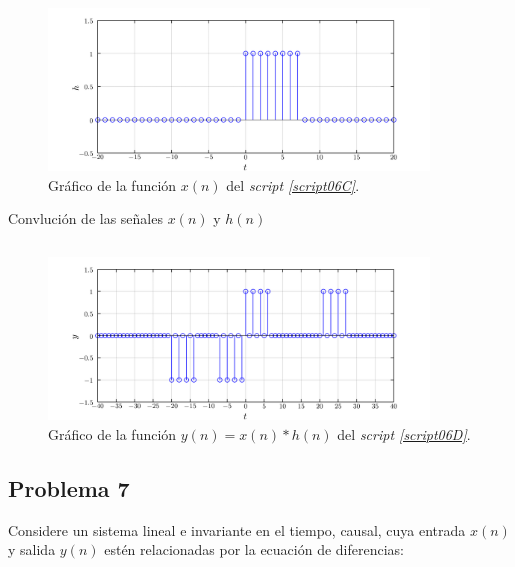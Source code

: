 \documentclass[a4paper,12pt,final]{article}
\begin{document}
    \begin{figure}[H]
      \begin{center}
        \caption{Gráfico de la función $x\left(n\right)$ del \emph{script \ref{script06C}}.}
        \includegraphics[width=0.90\textwidth]{./laboratorio_3/problema06_H.png}
      \end{center}
    \end{figure}

    \begin{listing}[H]
      \caption{Convlución de las señales $x\left(n\right)$ y $h\left(n\right)$ }
      \label{script06D}
      \inputminted{matlab}{./laboratorio_3/problema06.m}
    \end{listing}

    \begin{figure}[H]
      \begin{center}
        \caption{Gráfico de la función $y\left(n\right) = x\left(n\right) * h\left(n\right)$ del \emph{script \ref{script06D}}.}
        \includegraphics[width=0.90\textwidth]{./laboratorio_3/problema06_conv.png}
      \end{center}
    \end{figure}

  \newpage
  \subsection*{Problema 7}
    \noindent Considere un sistema lineal e invariante en el tiempo, causal,
    cuya entrada $x\left(n\right)$ y salida $y\left(n\right)$ estén
    relacionadas por la ecuación de diferencias:
\end{document}
